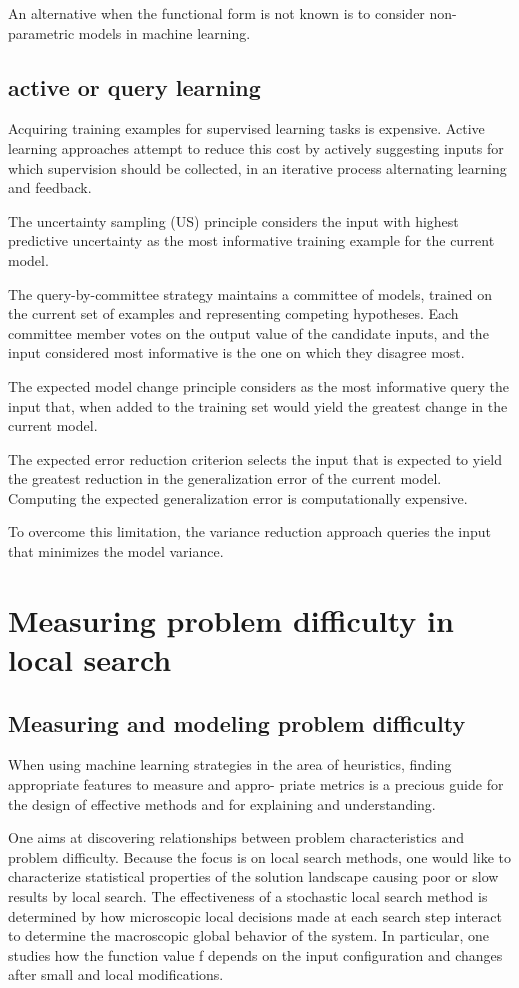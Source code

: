 \documentclass[10pt]{article}
\begin{document}
An alternative when the functional form is not known is to consider non-parametric models in machine learning.

\subsection{active or query learning}
Acquiring training examples for supervised learning tasks is expensive.
Active learning approaches attempt to reduce this cost by actively suggesting inputs for which supervision should be collected, in an iterative process alternating learning and feedback.

The uncertainty sampling (US) principle considers the input with highest predictive uncertainty as the most informative training example for the current model.

The query-by-committee strategy maintains a committee of models, trained on the current set of examples and representing competing hypotheses. Each committee member votes on the output value of the candidate inputs, and the input considered most informative is the one on which they disagree most. 

The expected model change principle considers as the most informative query the input that, when added to the training set would yield the greatest change in the current model.

The expected error reduction criterion selects the input that is expected to yield the greatest reduction in the generalization error of the current model. Computing the expected generalization error is computationally expensive.

To overcome this limitation, the variance reduction approach queries the input that minimizes the model variance.

\section{Measuring problem difficulty in local search}
\subsection{Measuring and modeling problem difficulty}

When using machine learning strategies in the area of heuristics, finding appropriate features to measure and appro-
priate metrics is a precious guide for the design of effective methods and for explaining and understanding.

One aims at discovering relationships between problem characteristics and problem difficulty. Because the focus is on local search methods, one would like to characterize statistical properties of the solution landscape causing poor or slow results by local search. The effectiveness of a stochastic local search method is determined by how microscopic local decisions made at each search step interact to determine the macroscopic global behavior of the system. In particular, one studies how the function value f depends on the input configuration and changes after small and local modifications.
\end{document}
